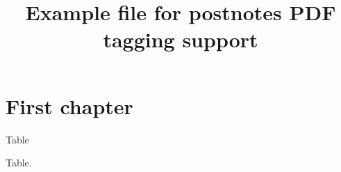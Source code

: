 \documentclass{book}
\title{Example file for postnotes PDF tagging support}
\begin{document}
\chapter{First chapter}



\begin{table}[p]
\caption{Table}
Table.
\end{table}



\clearpage


\printpostnotes
\end{document}
